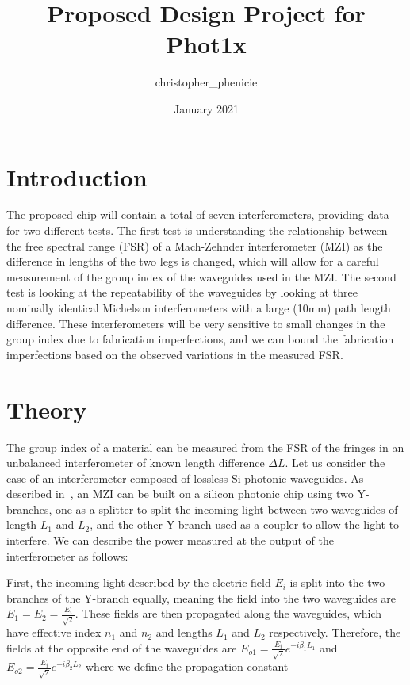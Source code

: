 \documentclass[journal]{IEEEtran}
\title{Proposed Design Project for Phot1x}
\date{January 2021}
\author{christopher\_phenicie}
\begin{document}
\maketitle

\section{Introduction}
\label{sec:intro}

The proposed chip will contain a total of seven interferometers, providing data for two different tests. The first test is understanding the relationship between the free spectral range (FSR) of a Mach-Zehnder interferometer (MZI) as the difference in lengths of the two legs is changed, which will allow for a careful measurement of the group index of the waveguides used in the MZI. The second test is looking at the repeatability of the waveguides by looking at three nominally identical Michelson interferometers with a large (10mm) path length difference. These interferometers will be very sensitive to small changes in the group index due to fabrication imperfections, and we can bound the fabrication imperfections based on the observed variations in the measured FSR.

\section{Theory}
\label{sec:theory}

The group index of a material can be measured from the FSR of the fringes in an unbalanced interferometer of known length difference $\Delta L$. Let us consider the case of an interferometer composed of lossless Si photonic waveguides. As described in~\cite{Chrostowski2015}, an MZI can be built on a silicon photonic chip using two Y-branches, one as a splitter to split the incoming light between two waveguides of length $L_1$ and $L_2$, and the other Y-branch used as a coupler to allow the light to interfere. We can describe the power measured at the output of the interferometer as follows:

First, the incoming light described by the electric field $E_i$ is split into the two branches of the Y-branch equally, meaning the field into the two waveguides are $E_1 = E_2 = \frac{E_i}{\sqrt{2}}$. These fields are then propagated along the waveguides, which have effective index $n_1$ and $n_2$ and lengths $L_1$ and $L_2$ respectively. Therefore, the fields at the opposite end of the waveguides are $E_{o1} = \frac{E_i}{\sqrt{2}} e^{-i \beta_1 L_1}$ and $E_{o2} = \frac{E_i}{\sqrt{2}} e^{-i \beta_2 L_2}$ where we define the propagation constant 
\end{document}

